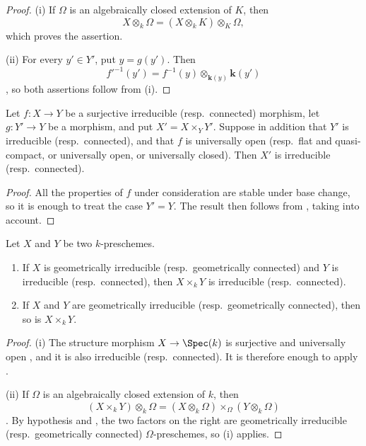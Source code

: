 \begin{proof}
(i) If $\Omega$ is an algebraically closed extension of $K$, then
\[
X\otimes_k\Omega
  =(X\otimes_k K)\otimes_K\Omega,
\]
which proves the assertion.

(ii) For every $y'\in Y'$, put $y=g(y')$.
Then
\[
f'^{-1}(y')
  =f^{-1}(y)\otimes_{\boldsymbol{k}(y)}\boldsymbol{k}(y')
\]
, so both assertions follow from (i).
\end{proof}

\begin{proposition}[4.5.7]
\label{IV.4.5.7}
Let $f:X\to Y$ be a surjective irreducible \textup{(resp.\ }connected\textup{)}
morphism, let $g:Y'\to Y$ be a morphism, and put
$X'=X\times_Y Y'$.
Suppose in addition that $Y'$ is irreducible \textup{(resp.\ }connected\textup{)}, and
that $f$ is universally open \textup{(resp.\ }flat and quasi-compact, or
universally open, or universally closed\textup{)}.
Then $X'$ is irreducible \textup{(resp.\ }connected\textup{)}.
\end{proposition}

\begin{proof}
All the properties of $f$ under consideration are stable under base
change, so it is enough to treat the case $Y'=Y$.
The result then follows from , taking
 into account.
\end{proof}

\begin{corollary}[4.5.8]
\label{IV.4.5.8}
Let $X$ and $Y$ be two $k$-preschemes.
\begin{enumerate}
\item[\rm(i)]
\label{IV.4.5.8.i}
If $X$ is geometrically irreducible \textup{(resp.\ }geometrically connected\textup{)}
and $Y$ is irreducible \textup{(resp.\ }connected\textup{)}, then $X\times_k Y$ is
irreducible \textup{(resp.\ }connected\textup{)}.

\item[\rm(ii)]
\label{IV.4.5.8.ii}
If $X$ and $Y$ are geometrically irreducible
\textup{(resp.\ }geometrically connected\textup{)}, then so is $X\times_k Y$.
\end{enumerate}
\end{corollary}

\begin{proof}
(i) The structure morphism
$X\to\Spec(k)$ is surjective and universally open
, and it is also irreducible (resp.\ connected).
It is therefore enough to apply .

(ii) If $\Omega$ is an algebraically closed extension of $k$, then
\[
(X\times_k Y)\otimes_k\Omega
  =(X\otimes_k\Omega)\times_\Omega(Y\otimes_k\Omega)
\]
.
By hypothesis and , the two factors on the right are
geometrically irreducible (resp.\ geometrically connected)
$\Omega$-preschemes, so (i) applies.
\end{proof}

